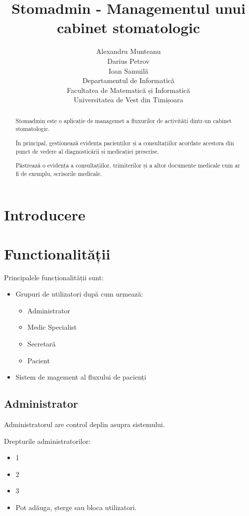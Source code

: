 \documentclass[a4paper,12pt]{article}
\title{Stomadmin - Managementul unui cabinet stomatologic}
\author{Alexandru Munteanu\\
Darius Petrov\\
Ioan Samuilă\\
Departamentul de Informatică\\
Facultatea de Matematică și Informatică\\
Universitatea de Vest din Timișoara}
\begin{document}
\maketitle
\begin{abstract}
Stomadmin este o aplicație de managemet a fluxurilor de activități dintr-un cabinet stomatologic.

 În principal, gestionează evidența pacienților și a consultațiilor acordate acestora din punct de vedere al diagnosticării și medicației prescrise. 

Păstrează o evidența a consultațiilor, trimiterilor și a altor documente medicale cum ar fi de exemplu, scrisorile medicale.  
\end{abstract}

\pagebreak

\tableofcontents

\pagebreak

\section{Introducere}



\section{Functionalității}

Principalele funcționalității sunt:
\begin{itemize}
\item Grupuri de utilizatori după cum urmează:
\begin{itemize}
\item Administrator
\item Medic Specialist
\item Secretară
\item Pacient
\end{itemize}
\item Sistem de magement al fluxului de pacienți
\end{itemize}

\subsection{Administrator}

Administratorul are control deplin asupra sistemului.

Drepturile administratorilor:

\begin{itemize}
\item 1
\item 2
\item 3
\item Pot adăuga, șterge sau bloca utilizatori.
\end{itemize}
\end{document}
